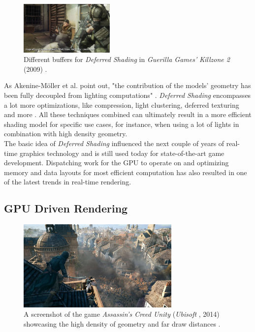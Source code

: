 \begin{figure}[!]
    \includegraphics[width=175px]{images/graphics/killzone-2-buffer-post.jpg}
    \caption{Different buffers for \emph{Deferred Shading} in \emph{Guerilla Games'} \emph{Killzone 2} (2009) 
    \cite{Valient2007}.}
    \label{fig:deferred-shading-buffers}
\end{figure}

\noindent
As Akenine-Möller et al. point out, "the contribution of the models’ geometry has been fully decoupled from lighting 
computations" \cite{AkenineMoeller2018}. \emph{Deferred Shading} encompasses a lot more optimizations, like compression, 
light clustering, deferred texturing and more \cite{AkenineMoeller2018}. All these techniques combined can ultimately 
result in a more efficient shading model for specific use cases, for instance, when using a lot of lights in combination 
with high density geometry.\\

\noindent
The basic idea of \emph{Deferred Shading} influenced the next couple of years of real-time graphics technology and is 
still used today for state-of-the-art game development. Dispatching work for the \ac{GPU} to operate on and optimizing 
memory and data layouts for most efficient computation has also resulted in one of the latest trends in real-time 
rendering.

\subsection*{GPU Driven Rendering}

\begin{figure}[h]
    \centering
    \includegraphics[width=300px]{images/graphics/assassins-creed-unity-gameplay.jpg}
    \caption{A screenshot of the game \emph{Assassin's Creed Unity} (\emph{Ubisoft} \cite{Ubisoft2014}, 2014) 
    showcasing the high density of geometry and far draw distances \cite{Burke2014}.}
    \label{fig:assassins-creed-unity-gameplay}
\end{figure}

